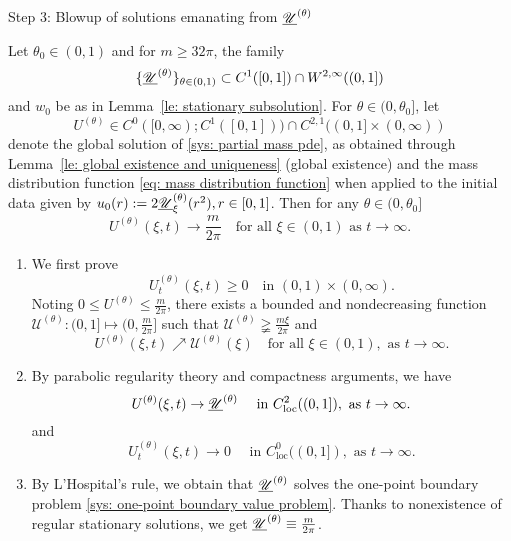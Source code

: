 \begin{frame}{Step 3: Blowup of solutions emanating from $\underline{\mathscr U}^{(\theta)}$}
\begin{lemma}\label{le: subsolution blow up}
	Let $\theta_0\in(0,1)$ and for $m \geqslant32\pi$, the family
\[
    \{\underline{\mathscr U}^{(\theta)}\}_{\theta\in(0,1)}\subset C^1([0, 1])\cap W^{2, \infty}((0, 1])
\]
and $w_0$ be as in Lemma~\ref{le: stationary subsolution}.
For $\theta\in (0, \theta_0]$, let
\[
    U^{(\theta)}\in C^0([0, \infty); C^1([0, 1])) \cap C^{2,1}((0, 1]\times(0, \infty))
\]
denote the global solution of \eqref{sys: partial mass pde},
as obtained through Lemma~\ref{le: global existence and uniqueness} (global existence) and the mass distribution function \eqref{eq: mass distribution function} when applied to the initial data given by $u_0(r) := 2\underline{\mathscr U}^{(\theta)}_\xi(r^2), r\in [0, 1]$.
	Then for any $\theta\in(0,\theta_0]$
	\begin{equation*}
		U^{(\theta)}(\xi, t) \rightarrow \frac{m}{2\pi}
        \quad\text {for all } \xi \in(0, 1) \text { as } t\to\infty.
	\end{equation*}
\end{lemma}
\end{frame}



\begin{frame}

\begin{enumerate}
  \item 	We first prove
	\begin{equation*}
U_t^{(\theta)}(\xi, t)\geqslant0 \quad\text{in } (0, 1)\times(0, \infty).
	\end{equation*}
Noting $0\leqslant U^{(\theta)} \leqslant \frac{m}{2\pi}$, there exists a bounded and nondecreasing function $\mathscr U^{(\theta)}:(0,1]\mapsto(0,\frac{m}{2\pi}]$ such that $\mathscr U^{(\theta)}\gneqq\frac{m\xi}{2\pi}$ and
\[
    U^{(\theta)}(\xi, t) \nearrow \mathscr U^{(\theta)}(\xi)
    \quad\text{for all } \xi\in(0,1), \text{ as }  t\to\infty.
\]
  \item By parabolic regularity theory and compactness arguments, we have 
      $$U^{(\theta)}(\xi, t) \to \underline{\mathscr U}^{(\theta)} \quad\text{ in } C^2_{\mathrm{loc}}((0, 1]), \text{ as }t\to\infty.$$ 
      and
      $$U^{(\theta)}_t(\xi, t) \to 0 \quad\text{ in } C^0_{\mathrm{loc}}((0, 1]), \text{ as }t\to\infty.$$ 
  \item By L'Hospital's rule, we obtain that $\underline{\mathscr U}^{(\theta)}$ solves the one-point boundary problem \eqref{sys: one-point boundary value problem}. Thanks to nonexistence of regular stationary solutions, we get $\underline{\mathscr U}^{(\theta)}\equiv\frac{m}{2\pi}$.
\end{enumerate}
\end{frame}

